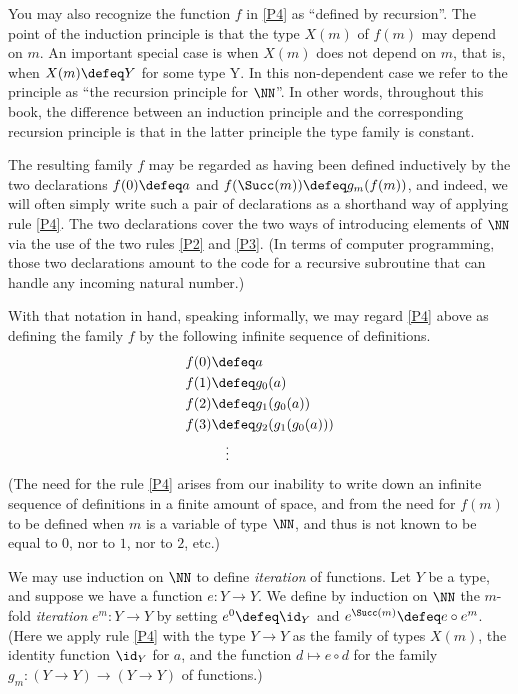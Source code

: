 You may also recognize the function $f$ in \ref{P4} as ``defined by recursion''.
The point of the induction principle is that the type $X(m)$ of
$f(m)$ may depend on $m$. An important special case is when $X(m)$
does not depend on $m$, that is, when $X(m)\defeq Y$ for some type Y.
In this non-dependent case we refer to the principle as
``the recursion principle for $\NN$''. In other words, throughout
this book, the difference between an induction principle and the
corresponding recursion principle is that in the latter principle
the type family is constant.


The resulting family $f$ may be regarded as having been defined inductively
by the two declarations $f(0) \defeq a$ and $f(\Succ(m)) \defeq g_m(f(m))$,
and indeed, we will often simply write such a pair of declarations as a shorthand way of applying rule \ref{P4}.
The two declarations cover the two ways of introducing elements of $\NN$ via the use of the two rules \ref{P2} and \ref{P3}.
(In terms of computer programming, those two declarations amount to the code for a recursive subroutine that can handle any incoming natural number.)

With that notation in hand, speaking informally, we may regard \ref{P4} above as defining the family $f$ by the following infinite sequence of definitions.
\begin{align*}
  f(0) & \defeq a \\
  f(1) & \defeq g_0(a) \\
  f(2) & \defeq g_1(g_0(a)) \\
  f(3) & \defeq g_2(g_1(g_0(a))) \\
  & \quad \vdots
\end{align*}
(The need for the rule \ref{P4} arises from our inability to write down an infinite sequence of definitions in a finite amount of space, and
from the need for $f(m)$ to be defined when $m$ is a variable of type $\NN$, and thus is not known to be equal to $0$, nor to $1$, nor to $2$,
etc.)

We may use induction on $\NN$ to define \emph{iteration} of functions.  Let $Y$ be a type, and suppose we have a function $e : Y \to Y$.  We
define by induction on $\NN$ the $m$-fold \emph{iteration} $e^m : Y \to Y$ by setting $e^0 \defeq \id_Y$ and $e^{\Succ(m)}\defeq e\circ e^m$.
(Here we apply rule \ref{P4} with the type $Y \to Y$ as the family of types $X(m)$, the identity function $\id_Y$ for $a$, and the function
$d \mapsto e\circ d$ for the family $g_m : (Y\to Y)\to(Y\to Y)$ of functions.)

